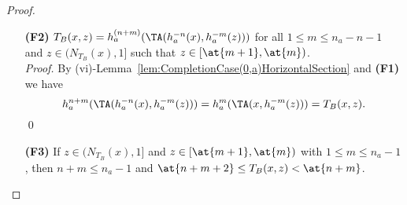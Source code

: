 \begin{proof}
\begin{itemize}
		\textit{Proof.} We provide a proof by induction on $m$.
		\begin{itemize}
			\item If $m=1$ we have $z \in [\at{2},\at{1})=[\TA(a,a),a)$ and then
			\begin{eqnarray*}
				h_a(\TA(x,h_a^{-1}(z))) &=& \TA(a,\TA(x,h_a^{-1}(z))) = T_B(a,T_B(x,h_a^{-1}(z)))  \\
				&=& T_B(x,T_B(a,h_a^{-1}(z))) = T_B(x,\TA(a,h_a^{-1}(z))) \\
				&=& T_B(x,z).
			\end{eqnarray*}
			\item We assume that the fact is true for all $\tilde{m}\geq 1$ such that $\tilde{m} < m $, i.e., for all $w \in (\NTB(x),1]$ such that $w \in [\at{\tilde{m}+1},\at{\tilde{m}})$ with $ 1 \leq \tilde{m} < m$ we have
			\begin{equation}\label{eq:induction(F1)}
				T_B(x,w) = h_a^{\tilde{m}}(\TA(x,h_a^{-\tilde{m}}(w))),
			\end{equation}
			and we prove it for $m$. Let $z \in [\at{m+1},\at{m})$, if we apply Equation (\ref{eq:induction(F1)}) we have
			\begin{eqnarray*}
				h_a^{m}(\TA(x,h_a^{-m}(z))) &=& h_a(h_a^{m-1}(\TA(x,h_a^{-m+1}(h_a^{-1}(z))))) = h_a(T_B(x,h_a^{-1}(z))) \\
				&=& \TA(a,T_B(x,h_a^{-1}(z))) = T_B(a,T_B(x,h_a^{-1}(z))) \\
				&=& T_B(x,T_B(a,h_a^{-1}(z))) = T_B(x,\TA(a,h_a^{-1}(z)))\\
				&=& T_B(x,z).
			\end{eqnarray*}
		\end{itemize}
		\qed
		\item[{\bf (F2)}] $T_B(x,z)=h_a^{(n+m)}(\TA(h_a^{-n}(x),h_a^{-m}(z)))$ for all $1 \leq m \leq n_a-n-1$ and $z \in (N_{T_B}(x),1]$ such that $z \in [\at{m+1},\at{m})$.\\
		
		\textit{Proof.} By (vi)-Lemma~\ref{lem:CompletionCase(0,a)HorizontalSection} and {\bf (F1)} we have
		$$h_a^{n+m}(\TA(h_a^{-n}(x),h_a^{-m}(z))) = h_a^{m}(\TA(x,h_a^{-m}(z))) = T_B(x,z).$$
		\qed
		\item[{\bf (F3)}] If $z \in (N_{T_B}(x),1]$ and $z \in [\at{m+1},\at{m})$ with $1 \leq m \leq n_a-1$, then $n+m \leq n_a-1$ and $ \at{n+m+2} \leq T_B(x,z) < \at{n+m}$.\\
		

\end{itemize}
\end{proof}
